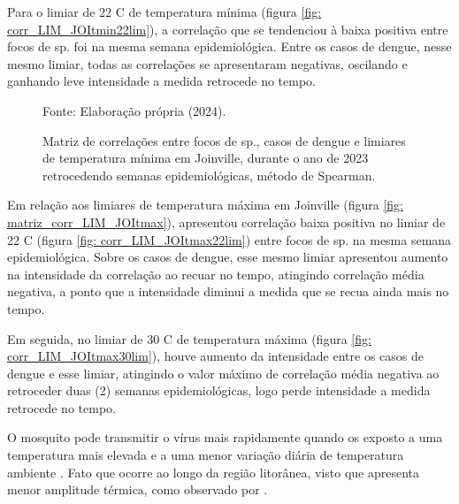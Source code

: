 \indent Para o limiar de 22 C de temperatura mínima (figura \ref{fig: corr_LIM_JOItmin22lim}), a correlação que se tendenciou à baixa positiva entre focos de  sp. foi na mesma semana epidemiológica. Entre os casos de dengue, nesse mesmo limiar, todas as correlações se apresentaram negativas, oscilando e ganhando leve intensidade a medida retrocede no tempo.

\begin{figure}[htbp]
    \begin{center}
    \caption{Matriz de correlações entre focos de  sp., casos de dengue e limiares de temperatura mínima em Joinville, durante o ano de 2023 retrocedendo semanas epidemiológicas, método de Spearman.}
    \label{fig: matriz_corr_LIM_JOItmin}
        \hfill
    \end{center}
    \small{Fonte: Elaboração própria (2024).}
\end{figure}

\indent Em relação aos limiares de temperatura máxima em Joinville (figura \ref{fig: matriz_corr_LIM_JOItmax}), apresentou correlação baixa positiva no limiar de 22 C (figura \ref{fig: corr_LIM_JOItmax22lim}) entre focos de  sp. na mesma semana epidemiológica. Sobre os casos de dengue, esse mesmo limiar apresentou aumento na intensidade da correlação ao recuar no tempo, atingindo correlação média negativa, a ponto que a intensidade diminui a medida que se recua ainda mais no tempo.

\indent Em seguida, no limiar de 30 C de temperatura máxima (figura \ref{fig: corr_LIM_JOItmax30lim}), houve aumento da intensidade entre os casos de dengue e esse limiar, atingindo o valor máximo de correlação média negativa ao retroceder duas (2) semanas epidemiológicas, logo perde intensidade a medida retrocede no tempo.

\indent O mosquito pode transmitir o vírus mais rapidamente quando os exposto a uma temperatura mais elevada e a uma menor variação diária de temperatura ambiente \cite{Valle2015Dengue}. Fato que ocorre ao longo da região litorânea, visto que apresenta menor amplitude térmica, como observado por .


